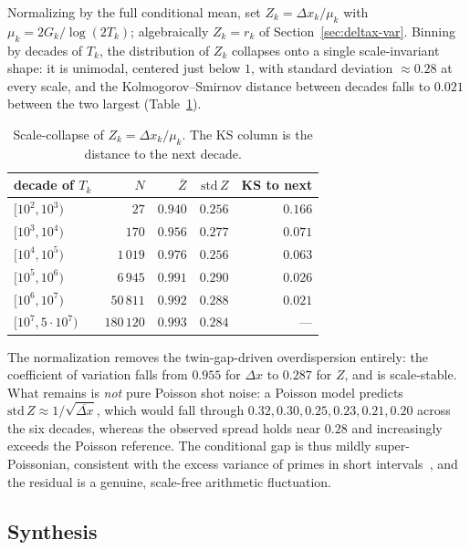 \documentclass[11pt]{article}
\begin{document}
Normalizing by the full conditional mean, set $Z_k=\Delta x_k/\mu_k$ with
$\mu_k=2G_k/\log(2T_k)$; algebraically $Z_k=r_k$ of
Section~\ref{sec:deltax-var}. Binning by decades of $T_k$, the distribution of
$Z_k$ collapses onto a single scale-invariant shape: it is unimodal, centered
just below $1$, with standard deviation $\approx 0.28$ at every scale, and the
Kolmogorov--Smirnov distance between decades falls to $0.021$ between the two
largest (Table~\ref{tab:deltax-collapse}).

\begin{table}[h]
\centering
\caption{Scale-collapse of $Z_k=\Delta x_k/\mu_k$. The KS column is the
distance to the next decade.}\label{tab:deltax-collapse}
\begin{tabular}{lrrrr}
\toprule
decade of $T_k$ & $N$ & $\overline{Z}$ & $\mathrm{std}\,Z$ & KS to next \\
\midrule
$[10^2,10^3)$        & $27$       & $0.940$ & $0.256$ & $0.166$ \\
$[10^3,10^4)$        & $170$      & $0.956$ & $0.277$ & $0.071$ \\
$[10^4,10^5)$        & $1\,019$   & $0.976$ & $0.256$ & $0.063$ \\
$[10^5,10^6)$        & $6\,945$   & $0.991$ & $0.290$ & $0.026$ \\
$[10^6,10^7)$        & $50\,811$  & $0.992$ & $0.288$ & $0.021$ \\
$[10^7,5\cdot10^7)$  & $180\,120$ & $0.993$ & $0.284$ & --- \\
\bottomrule
\end{tabular}
\end{table}

The normalization removes the twin-gap-driven overdispersion entirely: the
coefficient of variation falls from $0.955$ for $\Delta x$ to $0.287$ for $Z$,
and is scale-stable. What remains is \emph{not} pure Poisson shot noise: a
Poisson model predicts $\mathrm{std}\,Z\approx1/\sqrt{\overline{\Delta x}}$,
which would fall through $0.32,0.30,0.25,0.23,0.21,0.20$ across the six
decades, whereas the observed spread holds near $0.28$ and increasingly
exceeds the Poisson reference. The conditional gap is thus mildly
super-Poissonian, consistent with the excess variance of primes in short
intervals~\cite{MS2004}, and the residual is a genuine, scale-free arithmetic
fluctuation.

\subsection{Synthesis}\label{sec:deltax-synth}
\end{document}

